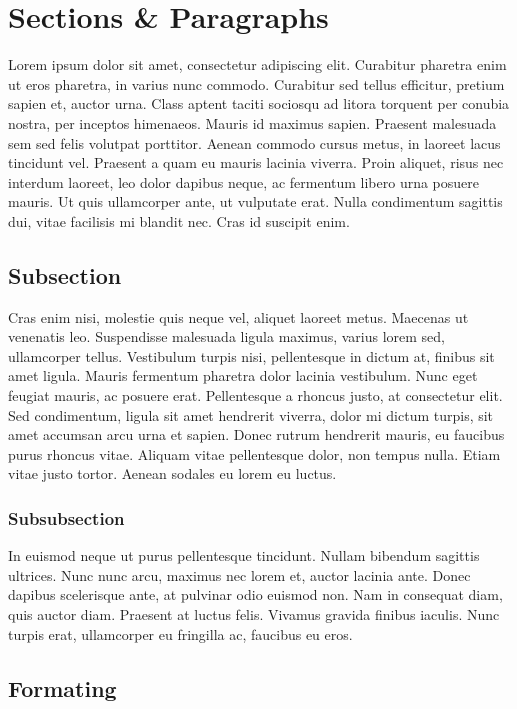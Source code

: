 \documentclass{article}
\begin{document}
\section{Sections \& Paragraphs}

Lorem ipsum dolor sit amet, consectetur adipiscing elit. Curabitur
pharetra enim ut eros pharetra, in varius nunc commodo. Curabitur sed
tellus efficitur, pretium sapien et, auctor urna. Class aptent taciti
sociosqu ad litora torquent per conubia nostra, per inceptos himenaeos.
Mauris id maximus sapien. Praesent malesuada sem sed felis volutpat
porttitor. Aenean commodo cursus metus, in laoreet lacus tincidunt vel.
Praesent a quam eu mauris lacinia viverra. Proin aliquet, risus nec
interdum laoreet, leo dolor dapibus neque, ac fermentum libero urna
posuere mauris. Ut quis ullamcorper ante, ut vulputate erat. Nulla
condimentum sagittis dui, vitae facilisis mi blandit nec. Cras id
suscipit enim.

\subsection{Subsection}

Cras enim nisi, molestie quis neque vel, aliquet laoreet metus. Maecenas
ut venenatis leo. Suspendisse malesuada ligula maximus, varius lorem
sed, ullamcorper tellus. Vestibulum turpis nisi, pellentesque in dictum
at, finibus sit amet ligula. Mauris fermentum pharetra dolor lacinia
vestibulum. Nunc eget feugiat mauris, ac posuere erat. Pellentesque a
rhoncus justo, at consectetur elit. Sed condimentum, ligula sit amet
hendrerit viverra, dolor mi dictum turpis, sit amet accumsan arcu urna
et sapien. Donec rutrum hendrerit mauris, eu faucibus purus rhoncus
vitae. Aliquam vitae pellentesque dolor, non tempus nulla. Etiam vitae
justo tortor. Aenean sodales eu lorem eu luctus.

\subsubsection{Subsubsection}

In euismod neque ut purus pellentesque tincidunt. Nullam bibendum
sagittis ultrices. Nunc nunc arcu, maximus nec lorem et, auctor lacinia
ante. Donec dapibus scelerisque ante, at pulvinar odio euismod non. Nam
in consequat diam, quis auctor diam. Praesent at luctus felis. Vivamus
gravida finibus iaculis. Nunc turpis erat, ullamcorper eu fringilla ac,
faucibus eu eros.

\subsection{Formating}
\end{document}
